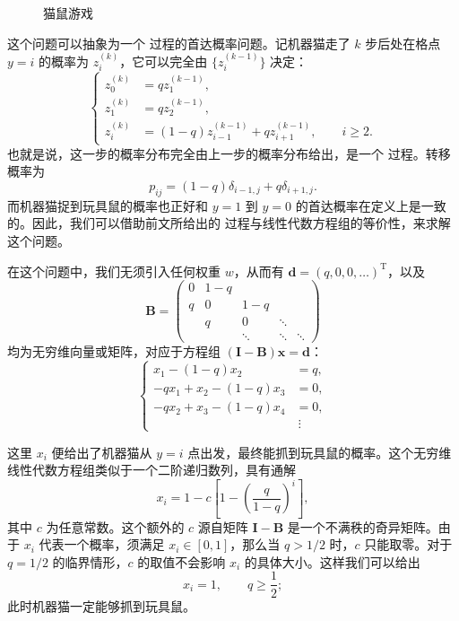 \begin{figure}[htbp]
\centering
{}
\caption{猫鼠游戏}
\label{fig:cat-mouse-game}
\end{figure}

这个问题可以抽象为一个  过程的首达概率问题。记机器猫走了 $k$ 步后处在格点 $y=i$ 的概率为 $z_i^{(k)}$，它可以完全由 $\{z_i^{(k-1)}\}$ 决定：
\begin{equation}
\left\{
\begin{aligned}
 z_0^{(k)}&=qz_1^{(k-1)},\\
 z_1^{(k)}&=qz_2^{(k-1)},\\
 z_i^{(k)}&=(1-q)z_{i-1}^{(k-1)}+qz_{i+1}^{(k-1)},\qquad i\ge2.
\end{aligned}
\right.
\tag{7.2.17}
\end{equation}
也就是说，这一步的概率分布完全由上一步的概率分布给出，是一个  过程。转移概率为
\[
 p_{ij}=(1-q)\delta_{i-1,j}+q\delta_{i+1,j}.
\]
而机器猫捉到玩具鼠的概率也正好和 $y=1$ 到 $y=0$ 的首达概率在定义上是一致的。因此，我们可以借助前文所给出的  过程与线性代数方程组的等价性，来求解这个问题。

在这个问题中，我们无须引入任何权重 $w$，从而有 $\bm d=(q,0,0,\ldots)^{\mathrm T}$，以及
\[
\mathbf B=\begin{pmatrix}
0&1-q&&&\\
q&0&1-q&&\\
& q&0&\ddots&\\
&&\ddots&\ddots&\ddots
\end{pmatrix}
\]
均为无穷维向量或矩阵，对应于方程组 $(\mathbf I-\mathbf B)\bm x=\bm d$：
\begin{equation}
\left\{
\begin{aligned}
 x_1-(1-q)x_2&=q,\\
 -qx_1+x_2-(1-q)x_3&=0,\\
 -qx_2+x_3-(1-q)x_4&=0,\\
 &\ \vdots
\end{aligned}
\right.
\tag{7.2.18}
\end{equation}

这里 $x_i$ 便给出了机器猫从 $y=i$ 点出发，最终能抓到玩具鼠的概率。这个无穷维线性代数方程组类似于一个二阶递归数列，具有通解
\begin{equation}
 x_i=1-c\left[1-\left(\frac{q}{1-q}\right)^i\right],
\tag{7.2.19}
\end{equation}
其中 $c$ 为任意常数。这个额外的 $c$ 源自矩阵 $\mathbf I-\mathbf B$ 是一个不满秩的奇异矩阵。由于 $x_i$ 代表一个概率，须满足 $x_i\in[0,1]$，那么当 $q>1/2$ 时，$c$ 只能取零。对于 $q=1/2$ 的临界情形，$c$ 的取值不会影响 $x_i$ 的具体大小。这样我们可以给出
\[
 x_i=1,\qquad q\ge\frac12;
\]
此时机器猫一定能够抓到玩具鼠。

